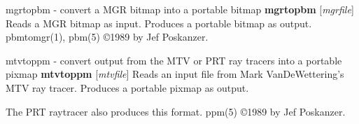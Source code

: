 \newpage
%

mgrtopbm - convert a MGR bitmap into a portable bitmap
{\bf mgrtopbm}
{\rm [}{\it mgrfile}{\rm ]}
Reads a MGR bitmap as input.
Produces a portable bitmap as output.
pbmtomgr(1), pbm(5)
\copyright 1989 by Jef Poskanzer.
%
 
%

\newpage
%

mtvtoppm - convert output from the MTV or PRT ray tracers into a portable pixmap
{\bf mtvtoppm}
{\rm [}{\it mtvfile}{\rm ]}
Reads an input file from Mark VanDeWettering's MTV ray tracer.
Produces a portable pixmap as output.
\par
The PRT raytracer also produces this format.
ppm(5)
\copyright 1989 by Jef Poskanzer.
%
 
